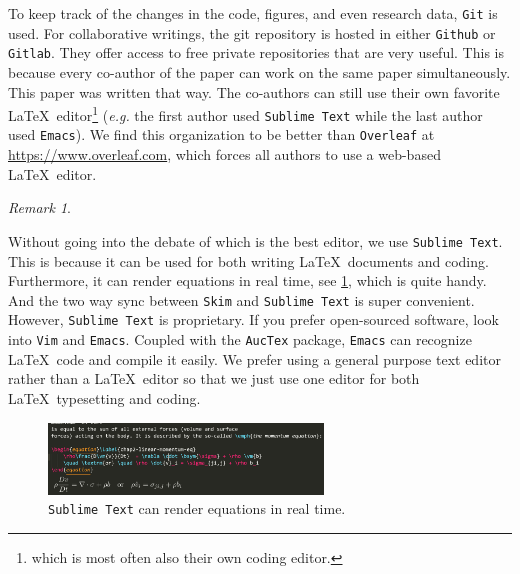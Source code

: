 \documentclass[authoryear,12pta4paper,fleqn]{article}
\newcommand{\eg}{\textit{e.g.}\xspace}
\numberwithin{equation}{section}
\theoremstyle{remark}
\newtheorem{rmk}{Remark}
\begin{document}
To keep track of the changes in the code, figures, and even research data, \texttt{Git} is used. For collaborative writings, the git repository is hosted in either \texttt{Github} or \texttt{Gitlab}. They offer access to free private repositories that are very useful. This is because every co-author of the paper can work on the same paper simultaneously. This paper was written that way. 
The co-authors can still use their own favorite \LaTeX\ editor\footnote{which is most often also their own coding editor.} (\eg the first author used \texttt{Sublime Text} while the last author used \texttt{Emacs}). We find this organization to be better than \texttt{Overleaf} at \url{https://www.overleaf.com}, which forces all authors to use a web-based \LaTeX\ editor.





\begin{rmk}\label{rm:a}

Without going into the debate of which is the best editor, we use \texttt{Sublime Text}. This is
because it can be used for both writing \LaTeX\ documents and coding. Furthermore, it can render equations in real time, see  \cref{fig:sublime-text}, which is quite handy. And the two way sync between \texttt{Skim} and \texttt{Sublime Text} is super convenient. However, \texttt{Sublime Text} is proprietary. If you prefer open-sourced software, look into \texttt{Vim} and \texttt{Emacs}. Coupled with the \texttt{AucTex} package, \texttt{Emacs} can recognize \LaTeX\ code and compile it easily. We prefer using a general purpose text editor rather than a \LaTeX\ editor so that we just use one editor  for both \LaTeX\ typesetting and coding. 


\begin{figure}[h!]
  \centering 
   \includegraphics[width=0.65\textwidth]{sublime-text}
   \caption{\texttt{Sublime Text} can render equations in real time.}
\label{fig:sublime-text}
\end{figure}
\end{rmk}
\end{document}
